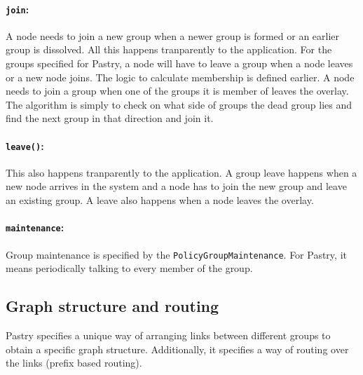 \paragraph{\texttt{join}:} A node needs to join a new group when a newer group is formed or an earlier group is dissolved. All this happens tranparently to the application. For the groups specified for Pastry, a node will have to leave a group when a node leaves or a new node joins. The logic to calculate membership is defined earlier. A node needs to join a group when one of the groups it is member of leaves the overlay. The algorithm is simply to check on what side of groups the dead group lies and find the next group in that direction and join it.

\paragraph{\texttt{leave()}:} This also happens tranparently to the application. A group leave happens when a new node arrives in the system and a node has to join the new group and leave an existing group. A leave also happens when a node leaves the overlay.

\paragraph{\texttt{maintenance}:} Group maintenance is specified by the \texttt{PolicyGroupMaintenance}. For Pastry, it means periodically talking to every member of the group.

\subsection{Graph structure and routing}
Pastry specifies a unique way of arranging links between different groups to obtain a specific graph structure. Additionally, it specifies a way of routing over the links (prefix based routing). 


